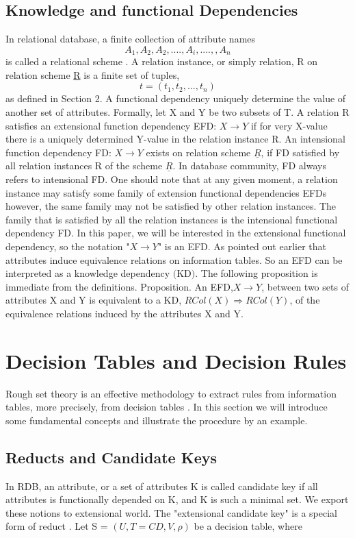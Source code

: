 \documentclass[12pt]{article}
\begin{document}
\subsection{Knowledge and functional Dependencies}
In relational database, a finite collection of attribute names \[{ A_{1}, A_{2}, A_{2},....,A_{i},....,, A_{n} } \] is called a relational scheme \cite{Ulmann89}. A relation instance, or simply relation, R on relation scheme \underline{R} is a finite set of tuples, \[t=( t_{1}, t_{2},..., t_{n} ) \]as defined in Section 2. A functional dependency uniquely determine the value of another set of attributes. Formally, let X and Y be two subsets of T. A relation R satisfies an extensional function dependency EFD: $X \rightarrow Y$ if for very X-value there is a uniquely determined Y-value in the relation instance R. An intensional function dependency FD: $X \rightarrow Y$ exists on relation scheme $\underline{R}$, if FD satisfied by all relation instances R of the scheme $\underline{R}$. In database community, FD always refers to intensional FD. One  should note that at any given moment, a relation instance may satisfy some family of extension functional dependencies EFDs however, the same family may not be satisfied by other relation instances. The family that is satisfied by all the relation instances is the intensional functional dependency FD. In this paper, we will be interested in the extensional functional dependency, so the notation "$X \rightarrow Y$" is an EFD.
As pointed out earlier that attributes induce equivalence relations on information tables.  So an EFD can be interpreted as a knowledge  dependency $($KD$)$. The following proposition is immediate from the definitions.
Proposition.  An EFD,$ X \rightarrow Y$,  between two sets of attributes X and Y is equivalent to a KD, $RCol(X) \Rightarrow RCol(Y)$, of the equivalence relations induced by the attributes X and Y. 
\section{Decision Tables and Decision Rules}
Rough set theory is an effective methodology to extract rules from information tables, more precisely, from decision tables \cite{Pawlak91}. In this section we will introduce some fundamental concepts and illustrate the procedure by an example. 
\subsection{Reducts and Candidate Keys}
In RDB, an attribute, or a set of attributes K is called candidate key if all attributes is functionally depended on K, and K is such a minimal set. We export these notions to extensional world. The "extensional candidate key" is a special form of reduct \cite{Pawlak91}. 
Let S = $(U, T=C  D, V, \rho)$ be a decision table, where
\end{document}
